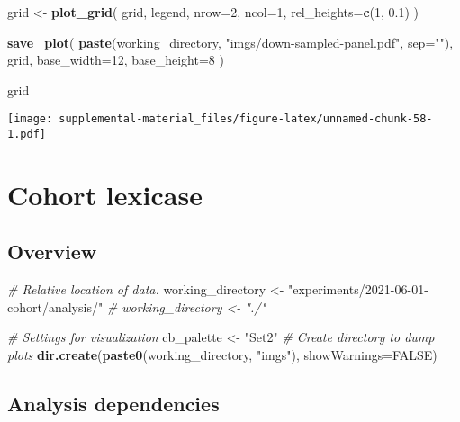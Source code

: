 \documentclass[]{book}
\newenvironment{Shaded}{\begin{snugshade}}{\end{snugshade}}
\newcommand{\CommentTok}[1]{\textcolor[rgb]{0.56,0.35,0.01}{\textit{#1}}}
\newcommand{\DataTypeTok}[1]{\textcolor[rgb]{0.13,0.29,0.53}{#1}}
\newcommand{\DecValTok}[1]{\textcolor[rgb]{0.00,0.00,0.81}{#1}}
\newcommand{\FloatTok}[1]{\textcolor[rgb]{0.00,0.00,0.81}{#1}}
\newcommand{\KeywordTok}[1]{\textcolor[rgb]{0.13,0.29,0.53}{\textbf{#1}}}
\newcommand{\NormalTok}[1]{#1}
\newcommand{\OtherTok}[1]{\textcolor[rgb]{0.56,0.35,0.01}{#1}}
\newcommand{\StringTok}[1]{\textcolor[rgb]{0.31,0.60,0.02}{#1}}
\begin{document}
\begin{Shaded}
\begin{Highlighting}[]
\NormalTok{grid <-}\StringTok{ }\KeywordTok{plot_grid}\NormalTok{(}
\NormalTok{  grid,}
\NormalTok{  legend,}
  \DataTypeTok{nrow=}\DecValTok{2}\NormalTok{,}
  \DataTypeTok{ncol=}\DecValTok{1}\NormalTok{,}
  \DataTypeTok{rel_heights=}\KeywordTok{c}\NormalTok{(}\DecValTok{1}\NormalTok{, }\FloatTok{0.1}\NormalTok{)}
\NormalTok{)}

\KeywordTok{save_plot}\NormalTok{(}
  \KeywordTok{paste}\NormalTok{(working_directory, }\StringTok{"imgs/down-sampled-panel.pdf"}\NormalTok{, }\DataTypeTok{sep=}\StringTok{""}\NormalTok{),}
\NormalTok{  grid,}
  \DataTypeTok{base_width=}\DecValTok{12}\NormalTok{,}
  \DataTypeTok{base_height=}\DecValTok{8}
\NormalTok{)}

\NormalTok{grid}
\end{Highlighting}
\end{Shaded}

\texttt{[image: supplemental-material\_files/figure-latex/unnamed-chunk-58-1.pdf]}

\hypertarget{cohort-lexicase}{%
\chapter{Cohort lexicase}\label{cohort-lexicase}}

\hypertarget{overview-5}{%
\section{Overview}\label{overview-5}}

\begin{Shaded}
\begin{Highlighting}[]
\CommentTok{# Relative location of data.}
\NormalTok{working_directory <-}\StringTok{ "experiments/2021-06-01-cohort/analysis/"}
\CommentTok{# working_directory <- "./"}

\CommentTok{# Settings for visualization}
\NormalTok{cb_palette <-}\StringTok{ "Set2"}
\CommentTok{# Create directory to dump plots}
\KeywordTok{dir.create}\NormalTok{(}\KeywordTok{paste0}\NormalTok{(working_directory, }\StringTok{"imgs"}\NormalTok{), }\DataTypeTok{showWarnings=}\OtherTok{FALSE}\NormalTok{)}
\end{Highlighting}
\end{Shaded}

\hypertarget{analysis-dependencies-5}{%
\section{Analysis dependencies}\label{analysis-dependencies-5}}
\end{document}
